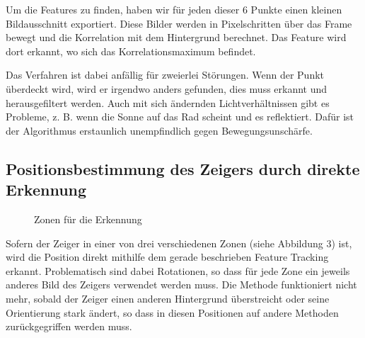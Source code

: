 \documentclass[a4paper,german,12pt,smallheadings]{scrartcl}
\begin{document}
Um die Features zu finden, haben wir für jeden dieser 6 Punkte einen kleinen
Bildausschnitt exportiert. Diese Bilder werden in Pixelschritten über das Frame
bewegt und die Korrelation mit dem Hintergrund berechnet. Das Feature wird dort
erkannt, wo sich das Korrelationsmaximum befindet.

Das Verfahren ist dabei anfällig für zweierlei Störungen. Wenn der Punkt
überdeckt wird, wird er irgendwo anders gefunden, dies muss erkannt und
herausgefiltert werden. Auch mit sich ändernden Lichtverhältnissen gibt es
Probleme, z. B. wenn die Sonne auf das Rad scheint und es reflektiert. Dafür
ist der Algorithmus erstaunlich unempfindlich gegen Bewegungsunschärfe.

\subsection{Positionsbestimmung des Zeigers durch direkte Erkennung}
\begin{figure}
  \label{zones}
  \caption{Zonen für die Erkennung}
\end{figure}
Sofern der Zeiger in einer von drei verschiedenen Zonen (siehe Abbildung 3)
ist, wird die Position direkt mithilfe dem gerade beschrieben Feature Tracking
erkannt. Problematisch sind dabei Rotationen, so dass für jede Zone ein jeweils
anderes Bild des Zeigers verwendet werden muss. Die Methode funktioniert nicht
mehr, sobald der Zeiger einen anderen Hintergrund überstreicht oder seine
Orientierung stark ändert, so dass in diesen Positionen auf andere Methoden
zurückgegriffen werden muss.
\end{document}
